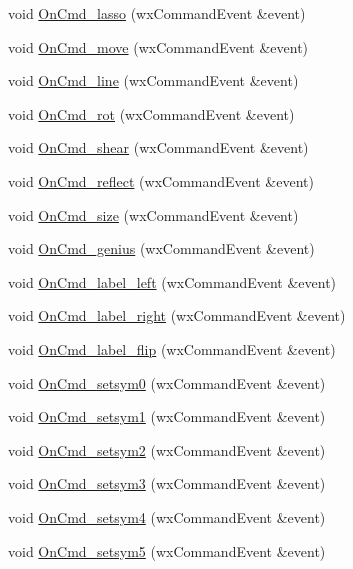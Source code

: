 \begin{DoxyCompactItemize}
\item 
void \hyperlink{a00102_a42b7b2374e728f5accd7d6a7bdb21de1}{On\-Cmd\-\_\-lasso} (wx\-Command\-Event \&event)
\item 
void \hyperlink{a00102_a072402aa2b7003c5c16f926860eeaac7}{On\-Cmd\-\_\-move} (wx\-Command\-Event \&event)
\item 
void \hyperlink{a00102_aa011152e97f917147e875a7760243858}{On\-Cmd\-\_\-line} (wx\-Command\-Event \&event)
\item 
void \hyperlink{a00102_abe4b6ded2bd9d3d15d44f4b82a28cac2}{On\-Cmd\-\_\-rot} (wx\-Command\-Event \&event)
\item 
void \hyperlink{a00102_a319487d88f93a7e4a884aab06fac3513}{On\-Cmd\-\_\-shear} (wx\-Command\-Event \&event)
\item 
void \hyperlink{a00102_aa26c9b0f926b76ebcc767aa5bca65a9c}{On\-Cmd\-\_\-reflect} (wx\-Command\-Event \&event)
\item 
void \hyperlink{a00102_a8812574fbe69715318e39a581658e954}{On\-Cmd\-\_\-size} (wx\-Command\-Event \&event)
\item 
void \hyperlink{a00102_a9cb815437887d3d28921e6049d1f32d8}{On\-Cmd\-\_\-genius} (wx\-Command\-Event \&event)
\item 
void \hyperlink{a00102_ae3e8ea753768a30b3436e666aa16e248}{On\-Cmd\-\_\-label\-\_\-left} (wx\-Command\-Event \&event)
\item 
void \hyperlink{a00102_af7b883b43478caee037b9ec9ac2f1c15}{On\-Cmd\-\_\-label\-\_\-right} (wx\-Command\-Event \&event)
\item 
void \hyperlink{a00102_a13de639750de961bdc848a25a5130711}{On\-Cmd\-\_\-label\-\_\-flip} (wx\-Command\-Event \&event)
\item 
void \hyperlink{a00102_a51d3b1811819f9f2861b2bf95bc4f716}{On\-Cmd\-\_\-setsym0} (wx\-Command\-Event \&event)
\item 
void \hyperlink{a00102_a3c6d39a3e688fb9e57e93afea764edb9}{On\-Cmd\-\_\-setsym1} (wx\-Command\-Event \&event)
\item 
void \hyperlink{a00102_a518106b10471b5da94b9d8b9262f361e}{On\-Cmd\-\_\-setsym2} (wx\-Command\-Event \&event)
\item 
void \hyperlink{a00102_a341a787a56b79807b8b7a00d84c5a6aa}{On\-Cmd\-\_\-setsym3} (wx\-Command\-Event \&event)
\item 
void \hyperlink{a00102_aecb865c72367c87ce205451e9109c5b1}{On\-Cmd\-\_\-setsym4} (wx\-Command\-Event \&event)
\item 
void \hyperlink{a00102_acffff703fc65c5de9c944e4bf9088b82}{On\-Cmd\-\_\-setsym5} (wx\-Command\-Event \&event)

\end{DoxyCompactItemize}
